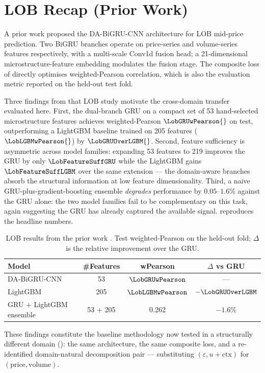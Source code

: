 \section{LOB Recap (Prior Work)}
\label{sec:lob-recap}

A prior work \cite{solovev2026lob} proposed the DA-BiGRU-CNN
architecture for LOB mid-price prediction.  Two BiGRU branches
operate on price-series and
volume-series features respectively, with a multi-scale Conv1d fusion
head; a 21-dimensional microstructure-feature embedding modulates the
fusion stage.  The composite loss of  directly
optimises weighted-Pearson correlation, which is also the evaluation
metric reported on the held-out test fold.

Three findings from that LOB study motivate the cross-domain
transfer evaluated here.  First, the dual-branch GRU on a compact set of 53
hand-selected microstructure features achieves
weighted-Pearson $\LobGRUwPearson{}$ on test, outperforming a
LightGBM \cite{ke2017lightgbm} baseline trained on 205 features
($\LobLGBMwPearson{}$) by $\LobGRUOverLGBM{}$.  Second, feature
sufficiency is asymmetric across model families: expanding 53 features
to 219 improves the GRU by only $\LobFeatureSuffGRU$ while the LightGBM
gains $\LobFeatureSuffLGBM$ over the same extension --- the
domain-aware branches absorb the structural information at low feature
dimensionality.  Third, a naive GRU-plus-gradient-boosting ensemble
\emph{degrades} performance by $0.05$--$1.6\%$ against the GRU alone:
the two model families fail to be complementary on this task, again
suggesting the GRU has already captured the available signal.
 reproduces the headline numbers.

\begin{table}[t]
\centering
\caption{LOB results from the prior work \cite{solovev2026lob}.
Test weighted-Pearson on the held-out fold; $\Delta$ is the relative
improvement over the GRU.}
\label{tab:lob-recap}
\begin{tabular}{lccc}
\toprule
Model & \#Features & wPearson & $\Delta$ vs GRU \\
\midrule
DA-BiGRU-CNN         & 53  & $\LobGRUwPearson$  & --- \\
LightGBM            & 205 & $\LobLGBMwPearson$ & $-\LobGRUOverLGBM$ \\
GRU + LightGBM ensemble & 53 + 205 & 0.262 & $-1.6\%$ \\
\bottomrule
\end{tabular}
\end{table}

These findings constitute the baseline methodology now tested in a
structurally different domain (): the same architecture, the same composite loss,
and a re-identified domain-natural decomposition pair --- substituting
$(\varepsilon, u+\text{ctx})$ for $(\text{price}, \text{volume})$.
